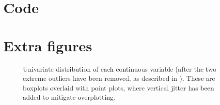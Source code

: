 \documentclass[a4paper, 12pt]{article}
\newcommand{\widefig}[1]{\makebox[\textwidth][c]{\texttt{[image: \#1]}}%
}
\begin{document}

\clearpage
\appendix

\section{Code}
% 

\section{Extra figures}

\begin{figure}
  \widefig{img/jitterbox_engine_capacity}
  \widefig{img/jitterbox_urban_metric}
  \widefig{img/jitterbox_extra_urban_metric}
  \widefig{img/jitterbox_combined_metric}
  \widefig{img/jitterbox_noise_level}
  \widefig{img/jitterbox_co2}
  \widefig{img/jitterbox_nox_emissions}
  \caption{Univariate distribution of each continuous variable (after the two extreme outliers have been removed, as described in ). These are boxplots overlaid with point plots, where vertical jitter has been added to mitigate overplotting.}
  \label{jitterboxes}
\end{figure}
\end{document}
